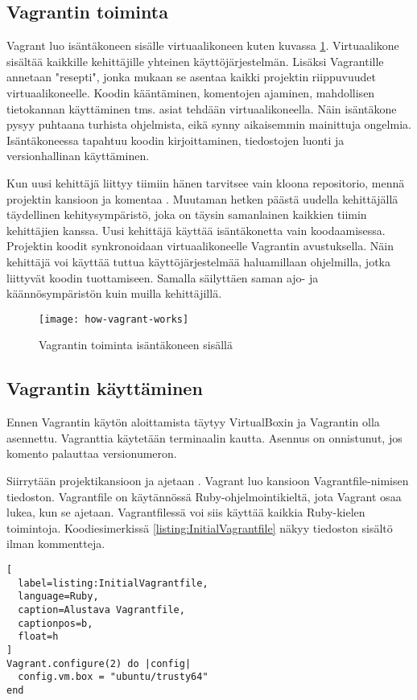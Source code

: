 \subsection{Vagrantin toiminta}
Vagrant luo isäntäkoneen sisälle virtuaalikoneen kuten kuvassa \ref{fig:how-vagrant-works}. Virtuaalikone sisältää kaikkille kehittäjille yhteinen käyttöjärjestelmän. Lisäksi Vagrantille annetaan "resepti", jonka mukaan se asentaa kaikki projektin riippuvuudet virtuaalikoneelle. Koodin kääntäminen, komentojen ajaminen, mahdollisen tietokannan käyttäminen tms. asiat tehdään virtuaalikoneella. Näin isäntäkone pysyy puhtaana turhista ohjelmista, eikä synny aikaisemmin mainittuja ongelmia. Isäntäkoneessa tapahtuu koodin kirjoittaminen, tiedostojen luonti ja versionhallinan käyttäminen.

Kun uusi kehittäjä liittyy tiimiin hänen tarvitsee vain kloona repositorio, mennä projektin kansioon ja komentaa . Muutaman hetken päästä uudella kehittäjällä täydellinen kehitysympäristö, joka on täysin samanlainen kaikkien tiimin kehittäjien kanssa. Uusi kehittäjä käyttää isäntäkonetta vain koodaamisessa. Projektin koodit synkronoidaan virtuaalikoneelle Vagrantin avustuksella. Näin kehittäjä voi käyttää tuttua käyttöjärjestelmää haluamillaan ohjelmilla, jotka liittyvät koodin tuottamiseen. Samalla säilyttäen saman ajo- ja käännösympäristön kuin muilla kehittäjillä.

\begin{figure}[h]
  \texttt{[image: how-vagrant-works]}
  \caption{Vagrantin toiminta isäntäkoneen sisällä}
  \label{fig:how-vagrant-works}
\end{figure}

\subsection{Vagrantin käyttäminen}
Ennen Vagrantin käytön aloittamista täytyy VirtualBoxin ja Vagrantin olla asennettu. Vagranttia käytetään terminaalin kautta. Asennus on onnistunut, jos komento  palauttaa versionumeron.

Siirrytään projektikansioon ja ajetaan . Vagrant luo kansioon Vagrantfile-nimisen tiedoston. Vagrantfile on käytännössä Ruby-ohjelmointikieltä, jota Vagrant osaa lukea, kun se ajetaan. Vagrantfilessä voi siis käyttää kaikkia Ruby-kielen toimintoja. Koodiesimerkissä \ref{listing:InitialVagrantfile} näkyy tiedoston sisältö ilman kommentteja.

\begin{lstlisting}[
  label=listing:InitialVagrantfile,
  language=Ruby,
  caption=Alustava Vagrantfile,
  captionpos=b,
  float=h
]
Vagrant.configure(2) do |config|
  config.vm.box = "ubuntu/trusty64"
end
\end{lstlisting}


